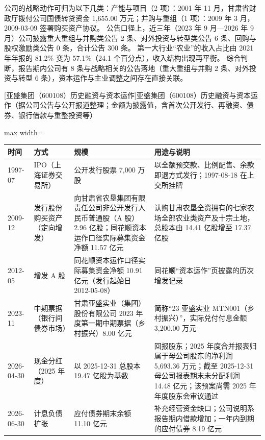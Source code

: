  公司的战略动作可归为以下几类：产能与项目（2 项）：2001 年 11 月，甘肃省财政厅拨付公司国债转贷资金 1,655.00 万元；并购与重组（1 项）：2009 年 3 月，2009-03-09 签署购买资产协议。 公告口径上，近三年（2023 年 9 月---2026 年 9 月）公司披露重大重组与并购类公告 2 条、对外投资与转型类公告 6 条、回购与股权激励类公告 0 条，合计公告 300 条。 第一大行业“农业”的收入占比由 2021 年年报的 81.2\% 变为 57.1\%（24.1 个百分点），收入结构出现再平衡。 综合判断，报告期内公司有 8 条与战略相关的公告落地（重大重组与并购 2 条、对外投资与转型 6 条），资本运作与主业调整之间存在直接关联。

\begin{center}\small\setlength{\tabcolsep}{4pt}
[亚盛集团（600108）历史融资与资本运作]{亚盛集团（600108）历史融资与资本运作（据公司公告与公开报道整理；金额为披露值，含首次公开发行、再融资、债券、银行借款与重整投资等）}
\begin{adjustbox}{max width=\textwidth}
\begin{tabular}{@{}p{1.45cm}p{2.55cm}p{4.05cm}p{4.95cm}@{}}
\toprule
时间 & 方式 & 规模 & 用途与说明 \\
\midrule
1997-07 & IPO（上海证券交易所） & 公开发行股票 7,\allowbreak{}000 万股 & 以全额预交款、\allowbreak{}比例配售、\allowbreak{}余款即退方式发行；1997-08-18 在上交所挂牌 \\
2009-12 & 发行股份购买资产（定向增发） & 向甘肃省农垦集团有限责任公司非公开发行人民币普通股（A 股）2.96 亿股；同花顺资本运作口径实际募集资金净额 11.57 亿元 & 认购甘肃农垦全资拥有的七家农场全部农业类资产及十宗土地，\allowbreak{}总股本由 14.41 亿股增至 17.37 亿股 \\
2012-05 & 增发 A 股 & 同花顺资本运作口径实际募集资金净额 10.91 亿元（发行起始日 2012-05-08） & 同花顺“资本运作”页披露的历次增发记录 \\
2023-11 & 中期票据（银行间债券市场） & 甘肃亚盛实业（集团）股份有限公司 2023 年度第一期中期票据（乡村振兴）8.00 亿元 & 简称“23 亚盛实业 MTN001（乡村振兴）”，\allowbreak{}实际兑付付息金额 3,\allowbreak{}200.00 万元 \\
2026-04-30 & 现金分红（2025 年度） & 以 2025-12-31 总股本 19.47 亿股为基数 & 回报股东；2025 年度合并报表归属于母公司股东的净利润 5,\allowbreak{}693.36 万元；截至 2025-12-31 母公司报表期末未分配利润 14.48 亿元；该预案尚需 2025 年年度股东会审议通过 \\
2026-06-30 & 计息负债扩张 & 应付债券期末余额 11.10 亿元 & 补充经营资金缺口；公司说明系报告期内借款增加；一年内到期的应付债券 8.19 亿元 \\
\bottomrule
\end{tabular}
\end{adjustbox}
\end{center}

